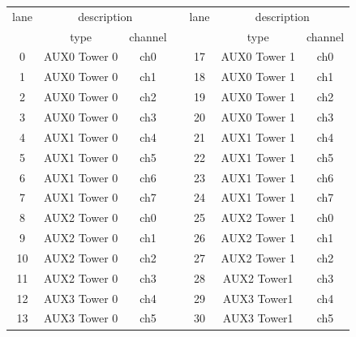 \documentclass[11pt,letterpaper]{article}
\begin{document}
\begin{table}[h]
\centering
\begin{tabular}{|c|c|c|c|c|c|c|}
\cline{1-3} \cline{5-7}
lane & \multicolumn{2}{c|}{description} &  & lane & \multicolumn{2}{c|}{description} \\ \cline{1-3} \cline{5-7} 
     & type              & channel      &  &      & type              & channel      \\ \cline{1-3} \cline{5-7} 
0    & AUX0 Tower 0      & ch0          &  & 17   & AUX0 Tower 1      & ch0          \\ \cline{1-3} \cline{5-7} 
1    & AUX0 Tower 0      & ch1          &  & 18   & AUX0 Tower 1      & ch1          \\ \cline{1-3} \cline{5-7} 
2    & AUX0 Tower 0      & ch2          &  & 19   & AUX0 Tower 1      & ch2          \\ \cline{1-3} \cline{5-7} 
3    & AUX0 Tower 0      & ch3          &  & 20   & AUX0 Tower 1      & ch3          \\ \cline{1-3} \cline{5-7} 
4    & AUX1 Tower 0      & ch4          &  & 21   & AUX1 Tower 1      & ch4          \\ \cline{1-3} \cline{5-7} 
5    & AUX1 Tower 0      & ch5          &  & 22   & AUX1 Tower 1      & ch5          \\ \cline{1-3} \cline{5-7} 
6    & AUX1 Tower 0      & ch6          &  & 23   & AUX1 Tower 1      & ch6          \\ \cline{1-3} \cline{5-7} 
7    & AUX1 Tower 0      & ch7          &  & 24   & AUX1 Tower 1      & ch7          \\ \cline{1-3} \cline{5-7} 
8    & AUX2 Tower 0      & ch0          &  & 25   & AUX2 Tower 1      & ch0          \\ \cline{1-3} \cline{5-7} 
9    & AUX2 Tower 0      & ch1          &  & 26   & AUX2 Tower 1      & ch1          \\ \cline{1-3} \cline{5-7} 
10   & AUX2 Tower 0      & ch2          &  & 27   & AUX2 Tower 1      & ch2          \\ \cline{1-3} \cline{5-7} 
11   & AUX2 Tower 0      & ch3          &  & 28   & AUX2 Tower1       & ch3          \\ \cline{1-3} \cline{5-7} 
12   & AUX3 Tower 0      & ch4          &  & 29   & AUX3 Tower1       & ch4          \\ \cline{1-3} \cline{5-7} 
13   & AUX3 Tower 0      & ch5          &  & 30   & AUX3 Tower1       & ch5          \\ \cline{1-3} \cline{5-7} 

\end{tabular}
\end{table}
\end{document}
